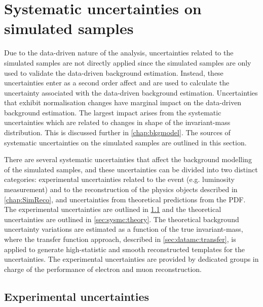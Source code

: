 \chapter{Systematic uncertainties on simulated samples}\label{chap:sysmc}

Due to the data-driven nature of the analysis, uncertainties related to the simulated samples are not directly applied since the simulated samples are only used to validate the data-driven background estimation. Instead, these uncertainties enter as a second order affect and are used to calculate the uncertainty associated with the data-driven background estimation. Uncertainties that exhibit normalisation changes have marginal impact on the data-driven background estimation. The largest impact arises from the systematic uncertainties which are related to changes in shape of the invariant-mass distribution. This is discussed further in \cref{chap:bkgmodel}. The sources of systematic uncertainties on the simulated samples are outlined in this section. 

There are several systematic uncertainties that affect the background modelling of the simulated samples, and these uncertainties can be divided into two distinct categories: experimental uncertainties related to the event (e.g. luminosity measurement) and to the reconstruction of the physics objects described in \cref{chap:SimReco}, and uncertainties from theoretical predictions from the PDF. The experimental uncertainties are outlined in \cref{sec:sysmc:exp} and the theoretical uncertainties are outlined in \cref{sec:sysmc:theory}. The theoretical background uncertainty variations are estimated as a function of the true invariant-mass, where the transfer function approach, described in \cref{sec:datamc:transfer}, is applied to generate high-statistic and smooth reconstructed templates for the uncertainties. The experimental uncertainties are provided by dedicated groups in charge of the performance of electron and muon reconstruction.

\section{Experimental uncertainties}\label{sec:sysmc:exp}

